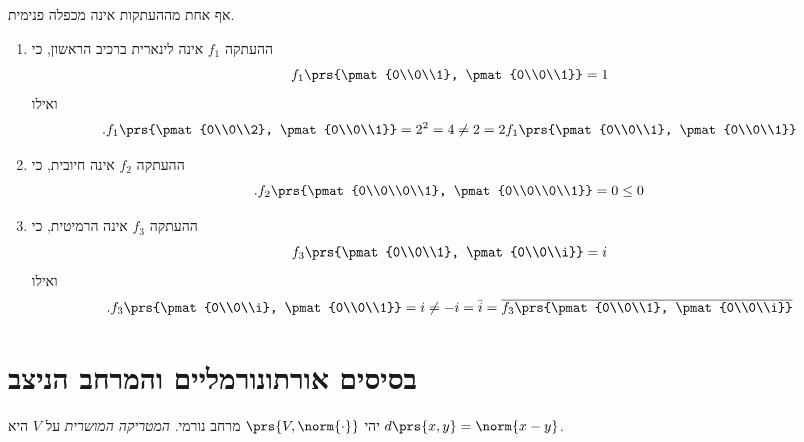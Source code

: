 \documentclass[a4paper,10pt,twoside,openany]{book}
\begin{document}
\begin{solution}
אף אחת מההעתקות אינה מכפלה פנימית.
\begin{enumerate}
\item
ההעתקה
$f_1$
אינה לינארית ברכיב הראשון, כי
\[f_1\prs{\pmat{0\\0\\1}, \pmat{0\\0\\1}} = 1\]
ואילו
\[\text{.} f_1\prs{\pmat{0\\0\\2}, \pmat{0\\0\\1}} = 2^2 = 4 \neq 2 = 2 f_1\prs{\pmat{0\\0\\1}, \pmat{0\\0\\1}}\]

\item
ההעתקה
$f_2$
אינה חיובית, כי
\[\text{.} f_2\prs{\pmat{0\\0\\0\\1}, \pmat{0\\0\\0\\1}} = 0 \leq 0\]

\item
ההעתקה
$f_3$
אינה הרמיטית, כי
\[f_3\prs{\pmat{0\\0\\1}, \pmat{0\\0\\i}} = i\]
ואילו
\[\text{.} f_3\prs{\pmat{0\\0\\i}, \pmat{0\\0\\1}} = i \neq -i = \bar{i} = \overline{f_3\prs{\pmat{0\\0\\1}, \pmat{0\\0\\i}}}\]
\end{enumerate}
\end{solution}

\section{בסיסים אורתונורמליים והמרחב הניצב}

\begin{definition}
יהי
$\prs{V,\norm{\cdot}}$
מרחב נורמי.
\emph{המטריקה המושרית}
על
$V$
היא
$d\prs{x,y} = \norm{x-y}$.
\end{definition}
\end{document}
